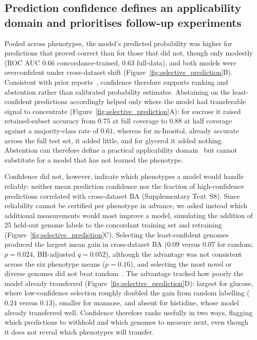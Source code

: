 \FloatBarrier{}

\subsection*{Prediction confidence defines an applicability domain and prioritises follow-up experiments}

Pooled across phenotypes, the model's predicted probability was higher for predictions that proved correct than for those that did not, though only modestly (ROC AUC $0.66$ concordance-trained, $0.63$ full-data), and both models were overconfident under cross-dataset shift (Figure~\ref{fig:selective_prediction}B).
Consistent with prior reports~\cite{NiculescuMizil2005Calibration}, confidence therefore supports ranking and abstention rather than calibrated probability estimates.
Abstaining on the least-confident predictions accordingly helped only where the model had transferable signal to concentrate (Figure~\ref{fig:selective_prediction}A): for sucrose it raised retained-subset accuracy from $0.75$ at full coverage to $0.88$ at half coverage against a majority-class rate of $0.61$, whereas for m-Inositol, already accurate across the full test set, it added little, and for glycerol it added nothing.
Abstention can therefore define a practical applicability domain~\cite{Weaver2008AppDomain,Geifman2017SelectiveClassification,Hendrickx2024Reject} but cannot substitute for a model that has not learned the phenotype.

Confidence did not, however, indicate which phenotypes a model would handle reliably: neither mean prediction confidence nor the fraction of high-confidence predictions correlated with cross-dataset BA (Supplementary Text~S8).
Since reliability cannot be certified per phenotype in advance, we asked instead which additional measurements would most improve a model, simulating the addition of 25 held-out genome labels to the concordant training set and retraining (Figure~\ref{fig:selective_prediction}C).
Selecting the least-confident genomes produced the largest mean gain in cross-dataset BA ($0.09$ versus $0.07$ for random; $p = 0.024$, BH-adjusted $q = 0.052$), although the advantage was not consistent across the six phenotype means ($p = 0.16$), and selecting the most novel or diverse genomes did not beat random~\cite{Vasanthakumari2024ActiveLearning}.
The advantage tracked how poorly the model already transferred (Figure~\ref{fig:selective_prediction}D): largest for glucose, where low-confidence selection roughly doubled the gain from random labelling ($0.24$ versus $0.13$), smaller for mannose, and absent for histidine, whose model already transferred well.
Confidence therefore ranks usefully in two ways, flagging which predictions to withhold and which genomes to measure next, even though it does not reveal which phenotypes will transfer.
